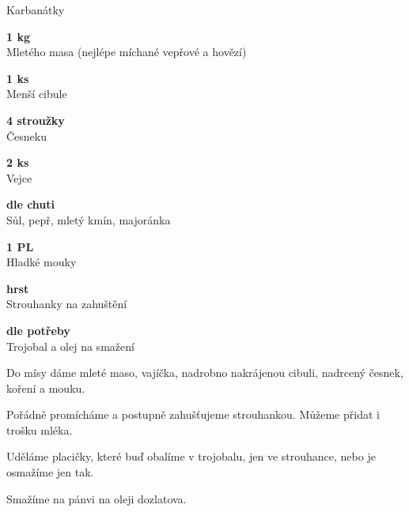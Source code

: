 \documentclass[11pt,a4paper]{article}
\begin{document}
\begin{recipe}[RosyBrown]{Karbanátky}
    \begin{ingredients}
        \item \parbox[t]{\linewidth}{\raggedright \weight \textbf{1 kg}\\ Mletého masa (nejlépe míchané vepřové a hovězí)}
        \item \parbox[t]{\linewidth}{\raggedright \piece \textbf{1 ks}\\ Menší cibule}
        \item \parbox[t]{\linewidth}{\raggedright \piece \textbf{4 stroužky}\\ Česneku}
        \item \parbox[t]{\linewidth}{\raggedright \piece \textbf{2 ks}\\ Vejce}
        \item \parbox[t]{\linewidth}{\raggedright \indefinite \textbf{dle chuti}\\ Sůl, pepř, mletý kmín, majoránka}
        \item \parbox[t]{\linewidth}{\raggedright \spoon \textbf{1 PL}\\ Hladké mouky}
        \item \parbox[t]{\linewidth}{\raggedright \indefinite \textbf{hrst}\\ Strouhanky na zahuštění}
        \item \parbox[t]{\linewidth}{\raggedright \indefinite \textbf{dle potřeby}\\ Trojobal a olej na smažení}
    \end{ingredients}
    \begin{steps}
        \item Do mísy dáme mleté maso, vajíčka, nadrobno nakrájenou cibuli, nadrcený česnek, koření a mouku.
        \item Pořádně promícháme a postupně zahušťujeme strouhankou. Můžeme přidat i trošku mléka.
        \item Uděláme placičky, které buď obalíme v trojobalu, jen ve strouhance, nebo je osmažíme jen tak.
        \item Smažíme na pánvi na oleji dozlatova.
    \end{steps}
\end{recipe}
\end{document}
